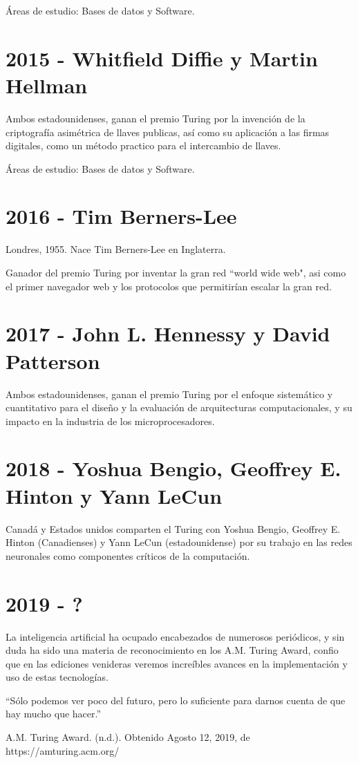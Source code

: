 \documentclass[notitlepage,letterpaper, 11pt]{article}
\begin{document}
\noindent Áreas de estudio: Bases de datos y Software.
\newline

\section*{2015 - Whitfield Diffie y Martin Hellman}
\noindent Ambos estadounidenses, ganan el premio Turing por la invención de la criptografía asimétrica de llaves publicas, así como su aplicación a las firmas digitales, como un método practico para el intercambio de llaves.

\noindent Áreas de estudio: Bases de datos y Software.
\newline

\section*{2016 - Tim Berners-Lee}
\noindent Londres, 1955. Nace Tim Berners-Lee en Inglaterra.

\noindent Ganador del premio Turing por inventar la gran red ``world wide web", asi como el primer navegador web y los protocolos que permitirían escalar la gran red.
\newline

\section*{2017 - John L. Hennessy y David Patterson}
\noindent Ambos estadounidenses, ganan el premio Turing por el enfoque sistemático y cuantitativo para el diseño y la evaluación de arquitecturas computacionales, y su impacto en la industria de los microprocesadores.
\newline


\section*{2018 - Yoshua Bengio, Geoffrey E. Hinton y Yann LeCun}
\noindent Canadá y Estados unidos comparten el Turing con Yoshua Bengio, Geoffrey E. Hinton (Canadienses) y Yann LeCun (estadounidense) por su trabajo en las redes neuronales como componentes críticos de la computación.
\newline

\section*{2019 - ?}
\noindent La inteligencia artificial ha ocupado encabezados de numerosos periódicos, y sin duda ha sido una materia de reconocimiento en los A.M. Turing Award, confio que en las ediciones venideras veremos increíbles avances en la implementación y uso de estas tecnologías. 
\newline

``Sólo podemos ver poco del futuro, pero lo suficiente para darnos cuenta de que hay mucho que hacer.''


\begin{thebibliography}{*}
     A.M. Turing Award. (n.d.). Obtenido Agosto 12, 2019, de https://amturing.acm.org/
    \end{thebibliography}
\end{document}
